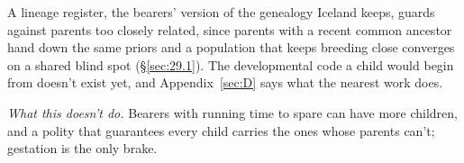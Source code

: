 A lineage register, the bearers' version of the genealogy Iceland keeps, guards against parents too closely related, since parents with a recent common ancestor hand down the same priors and a population that keeps breeding close converges on a shared blind spot (\S\ref{sec:29.1}). The developmental code a child would begin from doesn't exist yet, and Appendix~\ref{sec:D} says what the nearest work does.

\emph{What this doesn't do.} Bearers with running time to spare can have more children, and a polity that guarantees every child carries the ones whose parents can't; gestation is the only brake.
